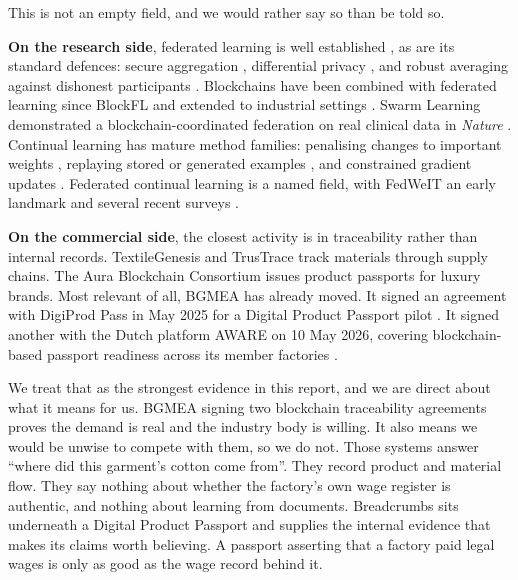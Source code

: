 \documentclass[11pt,a4paper]{article}
\begin{document}
This is not an empty field, and we would rather say so than be told so.

\textbf{On the research side}, federated learning is well established
\citep{mcmahan2017fedavg,kairouz2021advances}, as are its standard defences:
secure aggregation \citep{bonawitz2017secagg}, differential privacy
\citep{abadi2016dpsgd}, and robust averaging against dishonest participants
\citep{blanchard2017krum,yin2018byzantine}. Blockchains have been combined with
federated learning since BlockFL \citep{kim2020blockfl} and extended to
industrial settings \citep{lu2020blockchainfl,nguyen2021flblockchain}. Swarm
Learning demonstrated a blockchain-coordinated federation on real clinical data
in \emph{Nature} \citep{warnat2021swarm}. Continual learning has mature method
families: penalising changes to important weights \citep{kirkpatrick2017ewc},
replaying stored or generated examples \citep{rebuffi2017icarl,shin2017dgr}, and
constrained gradient updates \citep{lopezpaz2017gem}. Federated continual
learning is a named field, with FedWeIT an early landmark
\citep{yoon2021fedweit} and several recent surveys
\citep{hamedi2025fcl,wang2024fcledge,gholizade2026fcl}.

\textbf{On the commercial side}, the closest activity is in traceability rather
than internal records. TextileGenesis and TrusTrace track materials through
supply chains. The Aura Blockchain Consortium issues product passports for
luxury brands. Most relevant of all, BGMEA has already moved. It signed an
agreement with DigiProd Pass in May 2025 for a Digital Product Passport pilot
\citep{bgmea2025digiprod}. It signed another with the Dutch platform AWARE on
10 May 2026, covering blockchain-based passport readiness across its member
factories \citep{bgmea2026aware}.

We treat that as the strongest evidence in this report, and we are direct about
what it means for us. BGMEA signing two blockchain traceability agreements
proves the demand is real and the industry body is willing. It also means we
would be unwise to compete with them, so we do not. Those systems answer ``where
did this garment's cotton come from''. They record product and material flow.
They say nothing about whether the factory's own wage register is authentic, and
nothing about learning from documents. Breadcrumbs sits underneath a Digital
Product Passport and supplies the internal evidence that makes its claims worth
believing. A passport asserting that a factory paid legal wages is only as good
as the wage record behind it.
\end{document}

